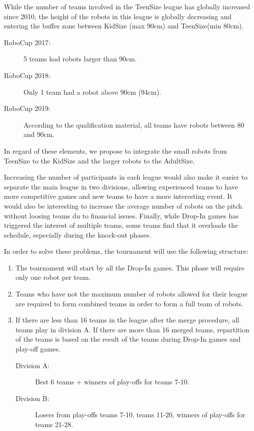 \documentclass{article}
\begin{document}
While the number of teams involved in the TeenSize league has globally increased
since 2010, the height of the robots in this league is globally decreasing and
entering the buffer zone between KidSize (max 90cm) and TeenSize(min 80cm).
\begin{description}
\item[RoboCup 2017:] 5 teams had robots larger than 90cm.
\item[RoboCup 2018:] Only 1 team had a robot above 90cm (94cm).
\item[RoboCup 2019:] According to the qualification material, all teams have
  robots between 80 and 90cm.
\end{description}

In regard of these elements, we propose to integrate the small robots from
TeenSize to the KidSize and the larger robots to the AdultSize.

Increasing the number of participants in each league would also make it easier
to separate the main league in two divisions, allowing experienced teams to have
more competitive games and new teams to have a more interesting event.
It would also be interesting to increase the average number of robots on
the pitch without loosing teams du to financial issues.
Finally, while Drop-In games has triggered the interest of multiple teams,
some teams find that it overloads the schedule, especially during the knock-out
phases.

In order to solve these problems, the tournament will use the following
structure:
\begin{enumerate}
\item The tournament will start by all the Drop-In games. This phase will
  require only one robot per team.
\item Teams who have not the maximum number of robots allowed for their league
  are required to form combined teams in order to form a full team of robots.
\item If there are less than 16 teams in the league after the merge procedure,
  all teams play in division A.
  If there are more than 16 merged teams, repartition of the teams is based
  on the result of the teams during Drop-In games and play-off games.
  \begin{description}
  \item[Division A:] Best 6 teams + winners of play-offs for teams 7-10.
  \item[Division B:] Losers from play-offs teams 7-10, teams 11-20,
    winners of play-offs for teams 21-28.
  \end{description}
\end{enumerate}
\end{document}
